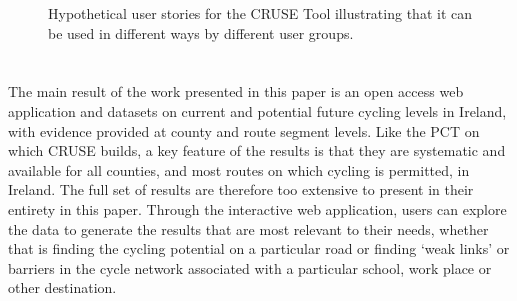 \documentclass[
  super,
  preprint,
  3p]{elsarticle}
\providecommand{\DIFadd}[1]{{\protect\color{blue}\uwave{#1}}} %
\providecommand{\DIFaddbegin}{} %
\providecommand{\DIFaddend}{} %
\providecommand{\DIFdelbegin}{} %
\providecommand{\DIFdelend}{} %
\providecommand{\DIFaddbeginFL}{} %
\providecommand{\DIFaddendFL}{} %
\providecommand{\DIFdelbeginFL}{} %
\providecommand{\DIFdelendFL}{} %
\newcommand{\DIFscaledelfig}{0.5}
\newlength{\DIFdelgraphicswidth} %
\newlength{\DIFdelgraphicsheight} %
\newcommand{\DIFaddincludegraphics}[2][]{{\color{blue}\fbox{\DIFOincludegraphics[#1]{#2}}}} %
\newcommand{\DIFdelincludegraphics}[2][]{%
\sbox{\DIFdelgraphicsbox}{\DIFOincludegraphics[#1]{#2}}%
\settoboxwidth{\DIFdelgraphicswidth}{\DIFdelgraphicsbox} %
\settoboxtotalheight{\DIFdelgraphicsheight}{\DIFdelgraphicsbox} %
\scalebox{\DIFscaledelfig}{%
\parbox[b]{\DIFdelgraphicswidth}{\usebox{\DIFdelgraphicsbox}\\[-\baselineskip] \rule{\DIFdelgraphicswidth}{0em}}\llap{\resizebox{\DIFdelgraphicswidth}{\DIFdelgraphicsheight}{%
\setlength{\unitlength}{\DIFdelgraphicswidth}%
\begin{picture}(1,1)%
\thicklines\linethickness{2pt} %
{\color[rgb]{1,0,0}\put(0,0){\framebox(1,1){}}}%
{\color[rgb]{1,0,0}\put(0,0){\line( 1,1){1}}}%
{\color[rgb]{1,0,0}\put(0,1){\line(1,-1){1}}}%
\end{picture}%
}\hspace*{3pt}}} %
} %
\DeclareRobustCommand{\DIFaddbegin}{\DIFOaddbegin \let\includegraphics\DIFaddincludegraphics} %
\DeclareRobustCommand{\DIFaddend}{\DIFOaddend \let\includegraphics\DIFOincludegraphics} %
\DeclareRobustCommand{\DIFdelbegin}{\DIFOdelbegin \let\includegraphics\DIFdelincludegraphics} %
\DeclareRobustCommand{\DIFdelend}{\DIFOaddend \let\includegraphics\DIFOincludegraphics} %
\DeclareRobustCommand{\DIFaddbeginFL}{\DIFOaddbeginFL \let\includegraphics\DIFaddincludegraphics} %
\DeclareRobustCommand{\DIFaddendFL}{\DIFOaddendFL \let\includegraphics\DIFOincludegraphics} %
\DeclareRobustCommand{\DIFdelbeginFL}{\DIFOdelbeginFL \let\includegraphics\DIFdelincludegraphics} %
\DeclareRobustCommand{\DIFdelendFL}{\DIFOaddendFL \let\includegraphics\DIFOincludegraphics} %
\begin{document}
\begin{figure}

\DIFdelbeginFL %


\DIFdelendFL \DIFaddbeginFL {}
\DIFaddendFL 

\caption{\label{fig-user-stories}Hypothetical user stories for the CRUSE
Tool illustrating that it can be used in different ways by different
user groups.}

\end{figure}%

\DIFdelbegin %
\DIFdelend \DIFaddbegin \section{\DIFadd{Results}}\label{sec-results}
\DIFaddend 

The main result of the work presented in this paper is an open access
web application and datasets on current and potential future cycling
levels in Ireland, with evidence provided at county and route segment
levels. Like the PCT on which CRUSE builds, a key feature of the results
is that they are systematic and available for all counties, and most
routes on which cycling is permitted, in Ireland. The full set of
results are therefore too extensive to present in their entirety in this
paper. Through the interactive web application, users can explore the
data to generate the results that are most relevant to their needs,
whether that is finding the cycling potential on a particular road or
finding `weak links' or barriers in the cycle network associated with a
particular school, work place or other destination.
\end{document}
